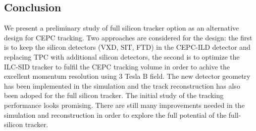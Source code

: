 \subsection{Conclusion} 
  We present a preliminary study of full silicon tracker option as an alternative design for CEPC tracking.
  Two approaches are considered for the design: the first is to keep the
  silicon detectors (VXD, SIT, FTD) in the CEPC-ILD detector and replacing TPC with additional silicon detectors,
  the second is to optimize the ILC-SID tracker to fulfil the CEPC tracking volume in order to achive the
  excellent momentum resolution using 3 Tesla B field. The new detector geometry has been implemented in
  the simulation and the track reconstruction has also been adoped for the full silicon tracker.
  The initial study of the tracking performance looks promising. There are still many improvements 
  needed in the simulation and reconstruction in order to explore the full potential of the full-silicon tracker. 

